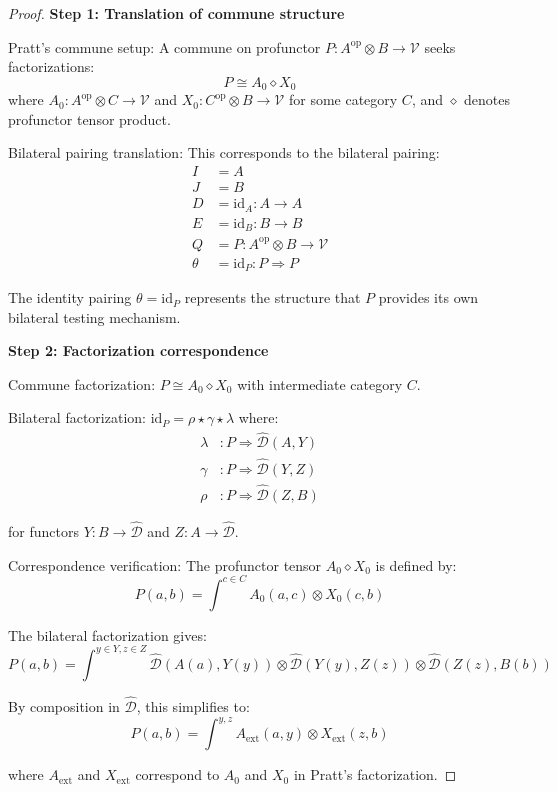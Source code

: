 \documentclass[11pt]{article}
\theoremstyle{plain}
\theoremstyle{definition}
\theoremstyle{remark}
\newcommand{\V}{\mathcal{V}}
\newcommand{\op}{\mathrm{op}}
\newcommand{\wh}[1]{\widehat{#1}}
\begin{document}
\begin{proof}
\textbf{Step 1: Translation of commune structure}

Pratt's commune setup: A commune on profunctor $P : A^{\op} \otimes B \to \V$ seeks factorizations:
$$P \cong A_0 \diamond X_0$$
where $A_0 : A^{\op} \otimes C \to \V$ and $X_0 : C^{\op} \otimes B \to \V$ for some category $C$, and $\diamond$ denotes profunctor tensor product.

Bilateral pairing translation: This corresponds to the bilateral pairing:
\begin{align}
I &= A \\
J &= B \\
D &= \text{id}_A : A \to A \\
E &= \text{id}_B : B \to B \\
Q &= P : A^{\op} \otimes B \to \V \\
\theta &= \text{id}_P : P \Rightarrow P
\end{align}

The identity pairing $\theta = \text{id}_P$ represents the structure that $P$ provides its own bilateral testing mechanism.

\textbf{Step 2: Factorization correspondence}

Commune factorization: $P \cong A_0 \diamond X_0$ with intermediate category $C$.

Bilateral factorization: $\text{id}_P = \rho \star \gamma \star \lambda$ where:
\begin{align}
\lambda &: P \Rightarrow \wh{\mathcal{D}}(A, Y) \\
\gamma &: P \Rightarrow \wh{\mathcal{D}}(Y, Z) \\
\rho &: P \Rightarrow \wh{\mathcal{D}}(Z, B)
\end{align}

for functors $Y : B \to \wh{\mathcal{D}}$ and $Z : A \to \wh{\mathcal{D}}$.

Correspondence verification: The profunctor tensor $A_0 \diamond X_0$ is defined by:
$$P(a, b) = \int^{c \in C} A_0(a, c) \otimes X_0(c, b)$$

The bilateral factorization gives:
$$P(a, b) = \int^{y \in Y, z \in Z} \wh{\mathcal{D}}(A(a), Y(y)) \otimes \wh{\mathcal{D}}(Y(y), Z(z)) \otimes \wh{\mathcal{D}}(Z(z), B(b))$$

By composition in $\wh{\mathcal{D}}$, this simplifies to:
$$P(a, b) = \int^{y, z} A_{\text{ext}}(a, y) \otimes X_{\text{ext}}(z, b)$$

where $A_{\text{ext}}$ and $X_{\text{ext}}$ correspond to $A_0$ and $X_0$ in Pratt's factorization.


\end{proof}
\end{document}
